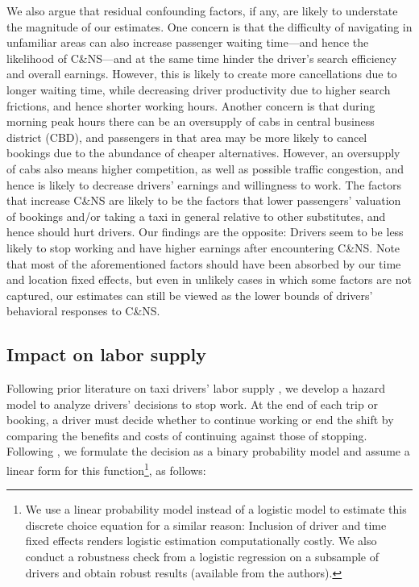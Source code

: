 \documentclass[reviewmode,AEJ]{AEA}
\begin{document}
We also argue that residual confounding factors, if any, are likely to understate the magnitude of our estimates.
One concern is that the difficulty of navigating in unfamiliar areas can also increase passenger waiting time---and 
hence the likelihood of C\&NS---and at the same time hinder the driver's search efficiency and overall earnings. 
However, this is likely to create more cancellations due to longer waiting time, while decreasing driver 
productivity due to higher search frictions, and hence shorter working hours.
Another concern is that during morning peak hours there can be an oversupply of cabs in central business 
district (CBD), and passengers in that area may be more likely to cancel bookings due to the abundance of
cheaper alternatives. However, an oversupply of cabs also means higher competition, as well as possible
traffic congestion, and hence is likely to decrease drivers' earnings and willingness to work.  
The factors that increase C\&NS are likely to be the factors that lower passengers' valuation of bookings
and/or taking a taxi in general relative to other substitutes, and hence should hurt drivers.
Our findings are the opposite: Drivers seem to be less likely to stop working and have higher earnings after 
encountering C\&NS. Note that most of the aforementioned factors should have been absorbed by our
time and location fixed effects, but even in unlikely cases in which some factors are not captured, 
our estimates can still be viewed as the lower bounds of drivers' behavioral responses to C\&NS.


\subsection{Impact on labor supply}
Following prior literature on taxi drivers' labor supply \citep{farber2005tomorrow,farber2015you,agarwal2015singaporean,chen2015dynamic}, we develop a hazard model 
to analyze drivers' decisions to stop work. At the end of each trip or booking, a driver must decide whether
to continue working or end the shift by comparing the benefits and costs of continuing against those of stopping. 
Following \citet{farber2005tomorrow,farber2015you}, we  
formulate the decision as a  binary probability model 
and assume a linear form for this function\footnote{We
use a linear probability model instead of a logistic model to estimate this discrete choice equation
for a similar reason: Inclusion of driver and time fixed effects renders logistic estimation computationally
costly. We also conduct a robustness check from a logistic regression on a subsample of drivers 
and obtain robust results (available from the authors).}, as follows:
\end{document}

